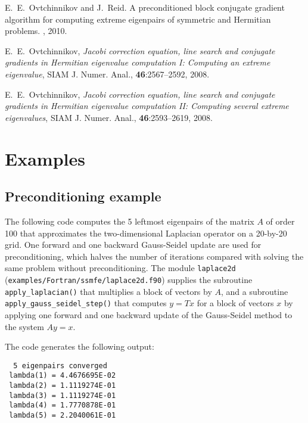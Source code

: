 
E.~E.~Ovtchinnikov and J.~Reid.
A preconditioned block conjugate gradient
algorithm for computing extreme eigenpairs
of symmetric and Hermitian problems.
\report, 2010.

E.~E.~Ovtchinnikov,
{\em Jacobi correction equation, line search and
conjugate gradients in Hermitian eigenvalue computation I:
Computing an extreme eigenvalue},
SIAM J. Numer. Anal., {\bf 46}:2567--2592, 2008.

E.~E.~Ovtchinnikov,
{\em Jacobi correction equation, line search and
conjugate gradients in Hermitian eigenvalue computation II:
Computing several extreme eigenvalues},
SIAM J. Numer. Anal., {\bf 46}:2593--2619, 2008.

\section{Examples}

\subsection{Preconditioning example}
\label{sec:ex.prec}

The following code 
computes the 5 leftmost eigenpairs of 
the matrix $A$ of order 100 that approximates 
the two-dimensional Laplacian operator
on a 20-by-20 grid.
One forward and one backward Gauss-Seidel update
are used for preconditioning,
which halves the number of iterations
compared with solving the same problem without preconditioning.
The module {\tt laplace2d} (\texttt{examples/Fortran/ssmfe/laplace2d.f90})
supplies the subroutine {\tt apply\_laplacian()}
that multiplies a block of vectors by $A$,
and a subroutine 
{\tt apply\_gauss\_seidel\_step()}
that computes $y = T x$ for a block of vectors $x$
by applying one forward and one backward update
of the Gauss-Seidel method to the system $A y = x$.

The code generates the following output:
\begin{verbatim}
  5 eigenpairs converged
 lambda(1) = 4.4676695E-02
 lambda(2) = 1.1119274E-01
 lambda(3) = 1.1119274E-01
 lambda(4) = 1.7770878E-01
 lambda(5) = 2.2040061E-01
\end{verbatim}
